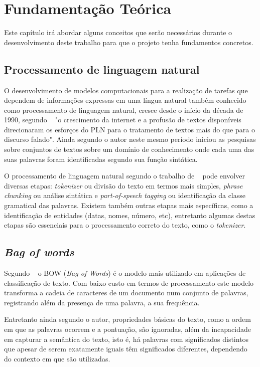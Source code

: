 \chapter{Fundamentação Teórica}\label{fund_teo}

Este capítulo irá abordar alguns conceitos que serão necessários durante o desenvolvimento
deste trabalho para que o projeto tenha fundamentos concretos.

\section{Processamento de linguagem natural}

O desenvolvimento de modelos computacionais para a realização de tarefas que dependem de informações expressas em uma língua natural também conhecido como processamento de linguagem natural, cresce desde o início da década de 1990, segundo ~\cite{vieira2010processamento} "o crescimento da internet e a profusão de textos disponíveis direcionaram os esforços do PLN para o tratamento de textos mais do que para o discurso falado". Ainda segundo o autor neste mesmo período iniciou as pesquisas sobre conjuntos de textos sobre um domínio de conhecimento onde cada uma das suas palavras foram identificadas segundo sua função sintática.

O processamento de linguagem natural segundo o trabalho de ~\cite{teixeira2011analise} pode envolver diversas etapas: \textit{tokenizer} ou divisão do texto em termos mais simples, \textit{phrase chunking} ou análise sintática e \textit{part-of-speech tagging} ou identificação da classe gramatical das palavras. Existem também outras etapas mais específicas, como a identificação de entidades (datas, nomes, número, etc), entretanto algumas destas etapas são essenciais para o processamento correto do texto, como o \textit{tokenizer}.    

\section{\textit{Bag of words}}

Segundo ~\cite{alexandra_alves:2010} o BOW (\textit{Bag of Words}) é o modelo mais utilizado em aplicações de classificação de texto. Com baixo custo em termos de processamento este modelo transforma a cadeia de caracteres de um documento num conjunto de palavras, registrando além da presença de uma palavra, a sua frequência.

Entretanto ainda segundo o autor, propriedades básicas do texto, como a ordem em que as palavras ocorrem e a pontuação, são ignoradas, além da incapacidade em capturar a semântica do texto, isto é, há palavras com significados distintos que apesar de serem exatamente iguais têm significados diferentes, dependendo do contexto em que são utilizadas.

